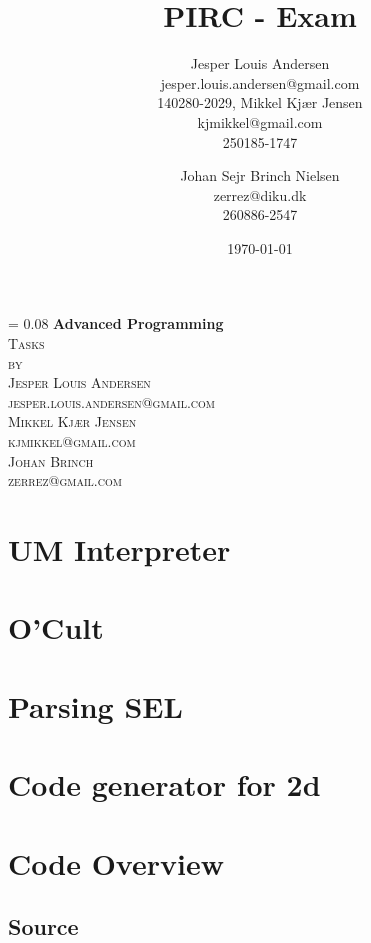 \documentclass[a4paper, oneside, 10pt, draft]{memoir}
\author{Jesper Louis
  Andersen\\jesper.louis.andersen@gmail.com\\140280-2029,
  Mikkel Kj\ae r Jensen \\ kjmikkel@gmail.com\\250185-1747 \and
  Johan Sejr Brinch Nielsen \\ zerrez@diku.dk \\ 260886-2547
}
\title{PIRC - Exam}
\date{\today}
\makeatletter
\renewcommand*{\titleM}{\begingroup%
  \drop = 0.08\textheight
  \centering
  {\Huge\bfseries Advanced Programming}\\[\baselineskip]
  {\scshape Tasks}\\[\baselineskip]
  {\scshape by}\\[\baselineskip]
  {\large\scshape Jesper Louis Andersen\\jesper.louis.andersen@gmail.com}\\[\baselineskip]
  {\large\scshape Mikkel Kj\ae r Jensen\\kjmikkel@gmail.com}\\[\baselineskip]
  {\large\scshape Johan Brinch\\zerrez@gmail.com}\\[\baselineskip]
  \endgroup}
\makeatother
\begin{document}
\titleM
\listoffixmes
\tableofcontents

\chapter{UM Interpreter}
\label{chap:task+1}

\chapter{O'Cult}
\label{chap:ocult}

\chapter{Parsing SEL}


\chapter{Code generator for 2d}
\label{compiler}








\appendix
\clearpage
\chapter{Code Overview}

\section{Source}
\end{document}
